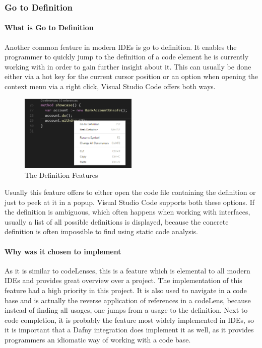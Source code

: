 \subsubsection{Go to Definition} \label{aggotodefinition}
\paragraph{What is Go to Definition}
Another common feature in modern IDEs is go to definition. It enables the programmer to quickly jump to the definition of a code element he is currently working with in order to gain further insight about it. This can usually be done either via a hot key for the current cursor position or an option when opening the context menu via a right click, Visual Studio Code offers both ways.\newline
\begin{figure}[H]
	\centering
	\includegraphics[width=0.5\textwidth]{img/goToDefinition}
	\caption{The Definition Features}
	\label{fig:aggotodefinition}
\end{figure}
Usually this feature offers to either open the code file containing the definition or just to peek at it in a popup. Visual Studio Code supports both these options. If the definition is ambiguous, which often happens when working with interfaces, usually a list of all possible definitions is displayed, because the concrete definition is often impossible to find using static code analysis.
\paragraph{Why was it chosen to implement}
As it is similar to codeLenses, this is a feature which is elemental to all modern IDEs and provides great overview over a project. The implementation of this feature had a high priority in this project. It is also used to navigate in a code base and is actually the reverse application of references in a codeLens, because instead of finding all usages, one jumps from a usage to the definition. \newline
Next to code completion, it is probably the feature most widely implemented in IDEs, so it is important that a Dafny integration does implement it as well, as it provides programmers an idiomatic way of working with a code base.
